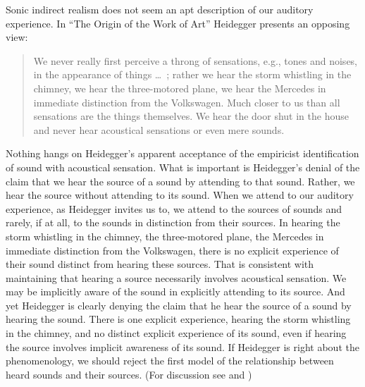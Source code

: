 \documentclass[12pt]{article}
\begin{document}
Sonic indirect realism does not seem an apt description of our auditory experience. In ``The Origin of the Work of Art'' Heidegger presents an opposing view:
\begin{quote}
	We never really first perceive a throng of sensations, e.g., tones and noises, in the appearance of things \ldots\ ; rather we hear the storm whistling in the chimney, we hear the three-motored plane, we hear the Mercedes in immediate distinction from the Volkswagen. Much closer to us than all sensations are the things themselves. We hear the door shut in the house and never hear acoustical sensations or even mere sounds. \citep{Heidegger:1935uq}
\end{quote}
Nothing hangs on Heidegger’s apparent acceptance of the empiricist identification of sound with acoustical sensation. What is important is Heidegger’s denial of the claim that we hear the source of a sound by attending to that sound. Rather, we hear the source without attending to its sound. When we attend to our auditory experience, as Heidegger invites us to, we attend to the sources of sounds and rarely, if at all, to the sounds in distinction from their sources. In hearing the storm whistling in the chimney, the three-motored plane, the Mercedes in immediate distinction from the Volkswagen, there is no explicit experience of their sound distinct from hearing these sources. That is consistent with maintaining that hearing a source necessarily involves acoustical sensation. We may be implicitly aware of the sound in explicitly attending to its source. And yet Heidegger is clearly denying the claim that he hear the source of a sound by hearing the sound. There is one explicit experience, hearing the storm whistling in the chimney, and no distinct explicit experience of its sound, even if hearing the source involves implicit awareness of its sound. If Heidegger is right about the phenomenology, we should reject the first model of the relationship between heard sounds and their sources. (For discussion see \citealt{Leddington:2014aa} and \citealt[chapter 3]{Kalderon:2018oe})
\end{document}
